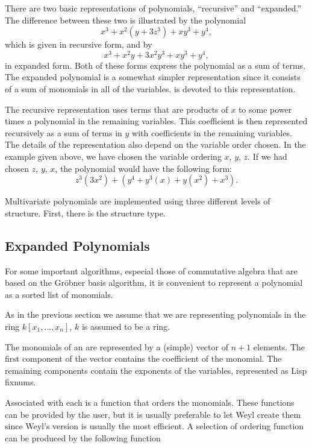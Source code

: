 There are two basic representations of polynomials, ``recursive'' and
``expanded.''  The difference between these two is illustrated by the
polynomial
\[
x^3 + x^2(y+3z^3) + xy^3 + y^4,
\]
which is given in recursive form, and by
\[
x^3 + x^2y + 3x^2 y^3 + xy^3 + y^4,
\]
in expanded form. Both of these forms express the polynomial as a sum
of terms. The expanded polynomial is a somewhat simpler representation
since it consists of a sum of monomials in all of the variables.
 is devoted to this representation.
  
The recursive representation uses terms that are products of $x$ to
some power times a polynomial in the remaining variables. This
coefficient is then represented recursively as a sum of terms in $y$
with coefficients in the remaining variables. The details of the
representation also depend on the variable order chosen. In the
example given above, we have chosen the variable ordering $x$, $y$,
$z$.  If we had chosen $z$, $y$, $x$, the polynomial would have the
following form:
\[
z^3(3x^2) + (y^4 + y^3(x) + y(x^2) + x^3).
\]
  
Multivariate polynomials are implemented using three different levels
of structure. First, there is the  structure
type. 


\subsection{Expanded Polynomials}
\label{ExpPoly:Rep:Sec}

For some important algorithms, especial those of commutative algebra
that are based on the Gr\"{o}bner basis algorithm, it is convenient to
represent a polynomial as a sorted list of monomials.
  
As in the previous section we assume that we are
representing polynomials in the ring $k[x_1, \ldots, x_n]$, $k$ is
assumed to be a ring.

The monomials of an  are represented by a
(simple) vector of $n+1$ elements. The first component of the vector
contains the coefficient of the monomial. The remaining components
contain the exponents of the variables, represented as Lisp fixnums.
  
Associated with each  is a function that orders
the monomials. These functions can be provided by the user, but it is
usually preferable to let Weyl create them since Weyl's version is
usually the most efficient. A selection of ordering function can be
produced by the following function

